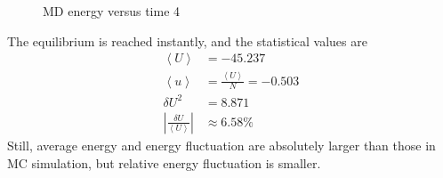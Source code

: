 \documentclass[letterpaper,12pt]{article}
\numberwithin{equation}{section}
\begin{document}
\begin{enumerate}[label=(\alph*)]
\begin{figure}[H]
        \caption{MD energy versus time 4}
        \label{fig:energy_to_time_md4}
    \end{figure}
    The equilibrium is reached instantly, and the statistical values are 
    \begin{equation}
        \begin{aligned}
            \left\langle U\right\rangle&= -45.237    \\
            \left\langle u\right\rangle&=\frac{\left\langle U\right\rangle}{N}=-0.503               \\
            \delta U^2&=8.871  \\
            \left| \frac{\delta U}{\left \langle U\right\rangle} \right|&\approx 6.58\%
        \end{aligned}
    \end{equation}
    Still, average energy and energy fluctuation are absolutely larger than those in MC simulation, but relative energy fluctuation is smaller. 
\end{enumerate}
\end{document}
